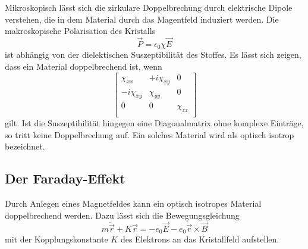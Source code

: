 \noindent
Mikroskopisch lässt sich die zirkulare Doppelbrechung durch elektrische Dipole verstehen, die in dem Material durch das 
Magentfeld induziert werden. Die makroskopische Polarisation des Kristalls 
\begin{equation*}
    \vec{P}=\epsilon_0\chi\vec{E}
\end{equation*}
ist abhängig von der dielektischen Suszeptibilität des Stoffes. Es lässt sich zeigen, dass ein Material doppelbrechend ist, wenn
\begin{equation}
    \left[
        \begin{array}{ccc}
        \chi_{xx}          & +i\chi_{xy} & 0         \\ 
        -i\chi_{xy}   & \chi_{yy}        & 0         \\
        0                  & 0                & \chi_{zz} \\ 
    \end{array}
    \right]
    \label{eqn:chi}
\end{equation}
gilt. Ist die Suszeptibilität hingegen eine Diagonalmatrix ohne komplexe Einträge, so tritt keine Doppelbrechung auf. Ein solches 
Material wird als optisch isotrop bezeichnet. 

\subsection{Der Faraday-Effekt}
Durch Anlegen eines Magnetfeldes kann ein optisch isotropes Material doppelbrechend werden. Dazu lässt sich die Bewegungsgleichung
\begin{equation*}
    m\ddot{\vec{r}}+K\vec{r}=-e_0\vec{E}-e_0\dot{\vec{r}}\times\vec{B}
\end{equation*}
mit der Kopplungskonstante $K$ des Elektrons an das Kristallfeld aufstellen.

